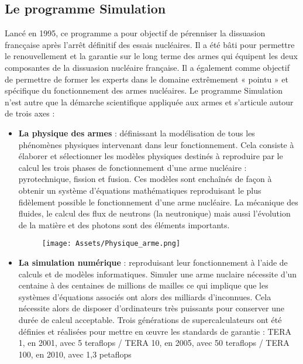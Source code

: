 \documentclass[12pt,a4paper]{report}
\begin{document}
\subsection{Le programme Simulation}
Lancé en 1995, ce programme a pour objectif de pérenniser la dissuasion francçaise après l’arrêt définitif des essais nucléaires. Il a été bâti pour permettre le renouvellement et la garantie sur le long terme des armes qui équipent les deux composantes de la dissuasion nucléaire française. Il a également comme objectif de permettre de former les experts dans le domaine extrêmement « pointu » et spécifique du fonctionnement des armes nucléaires. Le programme Simulation n’est autre que la démarche scientifique appliquée aux armes et s'articule autour de trois axes :
\renewcommand{\labelitemi}{$\bullet$}
\begin{itemize}
\item \textbf{La physique des armes} : définissant la modélisation de tous les phénomènes physiques intervenant dans leur fonctionnement. Cela consiste à élaborer et sélectionner les modèles physiques destinés à reproduire par le calcul les trois phases de fonctionnement d’une
arme nucléaire : pyrotechnique, fission et fusion. Ces modèles sont enchaînés de façon à obtenir un système d’équations mathématiques reproduisant le plus fidèlement possible le fonctionnement
d’une arme nucléaire. La mécanique des fluides, le calcul des flux de neutrons (la neutronique) mais aussi l’évolution de la matière et des photons sont des éléments importants.

\begin{figure}[H]
    \centering %
    \texttt{[image: Assets/Physique\_arme.png]}
\end{figure}

\item \textbf{La simulation numérique} : reproduisant leur fonctionnement à l'aide de calculs et de modèles informatiques. Simuler une arme nuclaire nécessite d'un centaine à des centaines de millions de mailles ce qui implique que les systèmes d'équations associés ont alors des milliards d'inconnues. Cela nécessite alors de disposer d’ordinateurs très puissants
pour conserver une durée de calcul acceptable. Trois générations de supercalculateurs ont été définies et réalisées pour mettre en œuvre les standards de garantie : TERA 1, en 2001, avec 5 teraflops / TERA 10, en 2005, avec 50 teraflops /  TERA 100, en 2010, avec 1,3 petaflops


\end{itemize}
\end{document}
